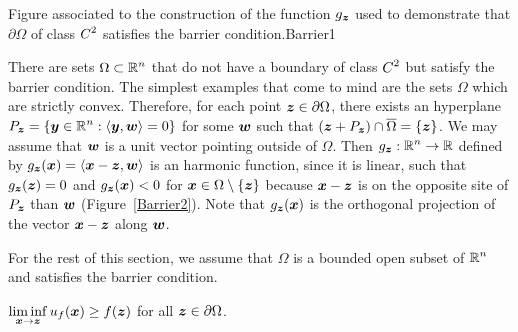 {Figure associated to the construction of the function $g_{{\bm{z}}}$
used to demonstrate that $\partial \Omega$ of class
$\displaystyle C^2$ satisfies the barrier condition.}{Barrier1}

There are sets $\displaystyle \Omega \subset \mathbb{R}^n$ that do not have a
boundary of class $\displaystyle C^2$ but satisfy the barrier
condition.  The simplest examples that come to mind are the sets
$\Omega$ which are strictly convex.
Therefore, for each point ${\bm{z}} \in \partial \Omega$, there exists an
hyperplane
$\displaystyle P_{{\bm{z}}} = \left\{ {\bm{y}} \in \mathbb{R}^n :
\left\langle{{\bm{y}}} , {{\bm{w}}}\right\rangle = 0 \right\}$ for some ${\bm{w}}$ such that
$({\bm{z}} + P_{{\bm{z}}}) \cap \overline{\Omega} = \{{\bm{z}}\}$.
We may assume that ${\bm{w}}$ is a unit vector pointing outside of $\Omega$.
Then $\displaystyle g_{{\bm{z}}}:\mathbb{R}^n \to \mathbb{R}$ defined by
$g_{{\bm{z}}}({\bm{x}}) = \left\langle{{\bm{x}} - {\bm{z}}} , {{\bm{w}}}\right\rangle$ is an
harmonic function, since it is linear, such that
$g_{{\bm{z}}}({\bm{z}}) = 0$ and
$g_{{\bm{z}}}({\bm{x}}) < 0$ for ${\bm{x}} \in \Omega \setminus \{{\bm{z}}\}$
because ${\bm{x}}-{\bm{z}}$ is on the opposite site of $P_{{\bm{z}}}$ than
${\bm{w}}$ (Figure~\ref{Barrier2}).
Note that $g_{{\bm{z}}}({\bm{x}})$ is the orthogonal projection of the vector 
${\bm{x}} - {\bm{z}}$ along ${\bm{w}}$.


For the rest of this section, we assume that $\Omega$ is a bounded
open subset of $\displaystyle \mathbb{R}^n$ and satisfies the barrier condition.  

\begin{lemma}
$\displaystyle \liminf_{{\bm{x}}\to {\bm{z}}} u_f({\bm{x}}) \geq f({\bm{z}})$
for all ${\bm{z}} \in \partial \Omega$.
\end{lemma}

